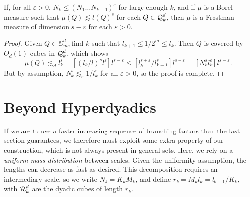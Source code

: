 \begin{theorem} \label{easyCoverTheorem}
	If, for all $\varepsilon > 0$, $N_k \leq (N_1 \dots N_{k-1})^\varepsilon$ for large enough $k$, and if $\mu$ is a Borel measure such that $\mu(Q) \lesssim l(Q)^s$ for each $Q \in \operatorname{\mathcal{Q}}_k^d$, then $\mu$ is a Frostman measure of dimension $s - \varepsilon$ for each $\varepsilon > 0$.
\end{theorem}
\begin{proof}
	Given $Q \in \DD^d_m$, find $k$ such that $l_{k+1} \leq 1/2^m \leq l_k$. Then $Q$ is covered by $O_d(1)$ cubes in $\operatorname{\mathcal{Q}}^d_k$, which shows
	\[ \mu(Q) \lesssim_d l_k^s = [(l_k/l)^s l^\varepsilon ] l^{s - \varepsilon} \leq [l_k^{s + \varepsilon} / l_{k+1}^s] l^{s - \varepsilon} = [N_k^s l_k^\varepsilon] l^{s-\varepsilon}. \]
	But by assumption, $N_k^s \lesssim_\varepsilon 1/l_k^\varepsilon$ for all $\varepsilon > 0$, so the proof is complete.
\end{proof}







\section{Beyond Hyperdyadics}

If we are to use a faster increasing sequence of branching factors than the last section guarantees, we therefore must exploit some extra property of our construction, which is not always present in general sets. Here, we rely on a \emph{uniform mass distribution} between scales. Given the uniformity assumption, the lengths can decrease as fast as desired. This decomposition requires an intermediary scale, so we write $N_k = K_k M_k$, and define $r_k = M_k l_k = l_{k-1}/K_k$, with $\operatorname{\mathcal{R}}_k^d$ are the dyadic cubes of length $r_k$.

